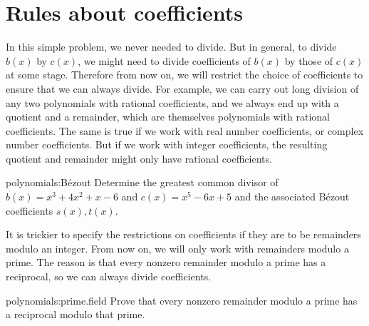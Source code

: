 \section{Rules about coefficients}
In this simple problem, we never needed to divide.
But in general, to divide \(b(x)\) by \(c(x)\), we might need to divide coefficients of \(b(x)\) by those of \(c(x)\) at some stage.
Therefore from now on, we will restrict the choice of coefficients to ensure that we can always divide.
For example, we can carry out long division of any two polynomials with rational coefficients, and we always end up with a quotient and a remainder, which are themselves polynomials with rational coefficients.
The same is true if we work with real number coefficients, or complex number coefficients.
But if we work with integer coefficients, the resulting quotient and remainder might only have rational coefficients.
\begin{problem}{polynomials:B\'ezout}
Determine the greatest common divisor of \(b(x) = x^3 +4x^2+x-6\) and \(c(x) = x^5-6x+5\) and the associated B\'ezout coefficients \(s(x), t(x)\).
\end{problem}

It is trickier to specify the restrictions on coefficients if they are to be remainders modulo an integer.
From now on, we will only work with remainders modulo a prime.
The reason is that every nonzero remainder modulo a prime has a reciprocal, so we can always divide coefficients.
\begin{problem}{polynomials:prime.field}
Prove that every nonzero remainder modulo a prime has a reciprocal modulo that prime.
\end{problem}

